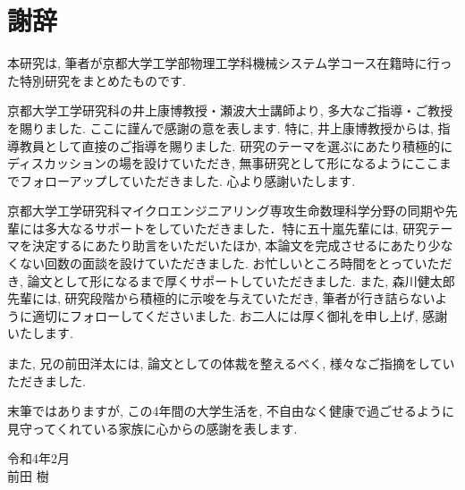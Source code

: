 
\chapter*{謝辞}

本研究は, 筆者が京都大学工学部物理工学科機械システム学コース在籍時に行った特別研究をまとめたものです.

京都大学工学研究科の井上康博教授・瀬波大士講師より, 多大なご指導・ご教授を賜りました. ここに謹んで感謝の意を表します. 特に, 井上康博教授からは, 指導教員として直接のご指導を賜りました. 研究のテーマを選ぶにあたり積極的にディスカッションの場を設けていただき, 無事研究として形になるようにここまでフォローアップしていただきました. 心より感謝いたします.

京都大学工学研究科マイクロエンジニアリング専攻生命数理科学分野の同期や先輩には多大なるサポートをしていただきました．特に五十嵐先輩には, 研究テーマを決定するにあたり助言をいただいたほか, 本論文を完成させるにあたり少なくない回数の面談を設けていただきました. お忙しいところ時間をとっていただき, 論文として形になるまで厚くサポートしていただきました. また, 森川健太郎先輩には, 研究段階から積極的に示唆を与えていただき, 筆者が行き詰らないように適切にフォローしてくださいました. お二人には厚く御礼を申し上げ, 感謝いたします.

また, 兄の前田洋太には, 論文としての体裁を整えるべく, 様々なご指摘をしていただきました.

末筆ではありますが, この4年間の大学生活を, 不自由なく健康で過ごせるように見守ってくれている家族に心からの感謝を表します.

\begin{flushright}
  令和4年2月\\
  前田 樹
\end{flushright}
